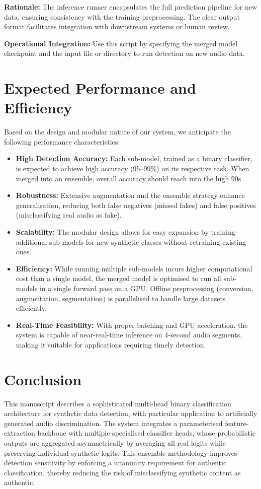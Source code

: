 \documentclass[conference]{IEEEtran}  %
\begin{document}
\textbf{Rationale:} The inference runner encapsulates the full prediction pipeline for new data, ensuring consistency with the training preprocessing. The clear output format facilitates integration with downstream systems or human review.

\textbf{Operational Integration:} Use this script by specifying the merged model checkpoint and the input file or directory to run detection on new audio data.

\section{Expected Performance and Efficiency}
Based on the design and modular nature of our system, we anticipate the following performance characteristics:
\begin{itemize}
    \item \textbf{High Detection Accuracy:} Each sub-model, trained as a binary classifier, is expected to achieve high accuracy (95--99\%) on its respective task. When merged into an ensemble, overall accuracy should reach into the high 90s.
    \item \textbf{Robustness:} Extensive augmentation and the ensemble strategy enhance generalisation, reducing both false negatives (missed fakes) and false positives (misclassifying real audio as fake).
    \item \textbf{Scalability:} The modular design allows for easy expansion by training additional sub-models for new synthetic classes without retraining existing ones.
    \item \textbf{Efficiency:} While running multiple sub-models incurs higher computational cost than a single model, the merged model is optimised to run all sub-models in a single forward pass on a GPU. Offline preprocessing (conversion, augmentation, segmentation) is parallelised to handle large datasets efficiently.
    \item \textbf{Real-Time Feasibility:} With proper batching and GPU acceleration, the system is capable of near-real-time inference on 4-second audio segments, making it suitable for applications requiring timely detection.
\end{itemize}

\section{Conclusion}
This manuscript describes a sophisticated multi-head binary classification architecture for synthetic data detection, with particular application to artificially generated audio discrimination. The system integrates a parameterised feature-extraction backbone with multiple specialised classifier heads, whose probabilistic outputs are aggregated asymmetrically by averaging all real logits while preserving individual synthetic logits. This ensemble methodology improves detection sensitivity by enforcing a unanimity requirement for authentic classification, thereby reducing the risk of misclassifying synthetic content as authentic.
\end{document}
